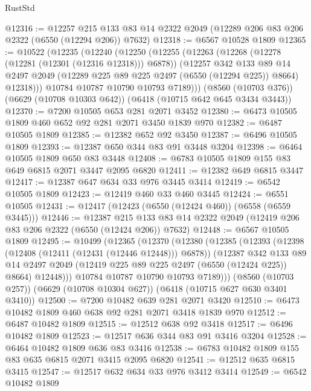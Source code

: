 \begin{lexlean}{RustStd}
\begin{coremodule}
@12316 := @12257
    @215
    @133
    @83
    @14
    @2322
    @2049
    (@12289 @206 @83 @206 @2322 (@6550 (@12294 @206)) @7632)
@12318 := @6567 @10528 @1809
@12365 := @10522
    (@12235
      (@12240
        (@12250
          (@12255
            (@12263
              (@12268 (@12278 (@12281 (@12301 (@12316 @12318))) @6878))
              (@12257
                @342
                @133
                @89
                @14
                @2497
                @2049
                (@12289 @225 @89 @225 @2497 (@6550 (@12294 @225)) @8664)
                @12318)))
          @10784
          @10787
          @10790
          @10793
          @7189)))
    (@8560 (@10703 @376))
    (@6629 (@10708 @10303 @642))
    (@6418 (@10715 @642 @645 @3434 @3443))
@12370 := @7200 @10505 @653 @281 @2071 @3452
@12380 := @6473 @10505 @1809 @460 @652 @92 @281 @2071 @3450 @1839 @970
@12382 := @6487 @10505 @1809
@12385 := @12382 @652 @92 @3450
@12387 := @6496 @10505 @1809
@12393 := @12387 @650 @344 @83 @91 @3448 @3204
@12398 := @6464 @10505 @1809 @650 @83 @3448
@12408 := @6783 @10505 @1809 @155 @83 @649 @6815 @2071 @3447 @2095 @6820
@12411 := @12382 @649 @6815 @3447
@12417 := @12387 @647 @634 @33 @976 @3445 @3414
@12419 := @6542 @10505 @1809
@12423 := @12419 @460 @33 @460 @3445
@12424 := @6551 @10505
@12431 := @12417 (@12423 (@6550 (@12424 @460)) (@6558 (@6559 @3445)))
@12446 := @12387
    @215
    @133
    @83
    @14
    @2322
    @2049
    (@12419 @206 @83 @206 @2322 (@6550 (@12424 @206)) @7632)
@12448 := @6567 @10505 @1809
@12495 := @10499
    (@12365
      (@12370
        (@12380
          (@12385
            (@12393
              (@12398 (@12408 (@12411 (@12431 (@12446 @12448))) @6878))
              (@12387
                @342
                @133
                @89
                @14
                @2497
                @2049
                (@12419 @225 @89 @225 @2497 (@6550 (@12424 @225)) @8664)
                @12448)))
          @10784
          @10787
          @10790
          @10793
          @7189)))
    (@8560 (@10703 @257))
    (@6629 (@10708 @10304 @627))
    (@6418 (@10715 @627 @630 @3401 @3410))
@12500 := @7200 @10482 @639 @281 @2071 @3420
@12510 := @6473 @10482 @1809 @460 @638 @92 @281 @2071 @3418 @1839 @970
@12512 := @6487 @10482 @1809
@12515 := @12512 @638 @92 @3418
@12517 := @6496 @10482 @1809
@12523 := @12517 @636 @344 @83 @91 @3416 @3204
@12528 := @6464 @10482 @1809 @636 @83 @3416
@12538 := @6783 @10482 @1809 @155 @83 @635 @6815 @2071 @3415 @2095 @6820
@12541 := @12512 @635 @6815 @3415
@12547 := @12517 @632 @634 @33 @976 @3412 @3414
@12549 := @6542 @10482 @1809

\end{coremodule}
\end{lexlean}
